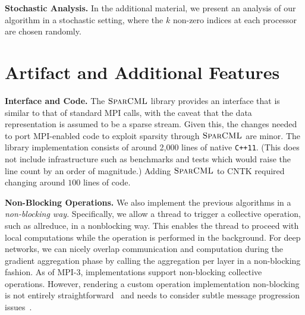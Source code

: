 \documentclass[11pt]{article}
\renewcommand{\paragraph}[1]{\vspace{0.1em} \noindent \textbf{#1}}
\newcommand{\mml}{$\textsc{SparCML}$}
\begin{document}
\paragraph{Stochastic Analysis.} In the additional material, we present an analysis of our algorithm in a stochastic setting, where the $k$ non-zero indices at each processor are chosen randomly.

\section{Artifact and Additional Features}
\label{sec:additional-features}

\paragraph{Interface and Code.} The \mml{} library provides an interface
that is similar to that of standard MPI calls, with the
caveat that the data representation is assumed to be a sparse stream.
Given this, the changes needed to port MPI-enabled code to exploit
sparsity through \mml{} are minor.  The library implementation consists
of around 2,000 lines of native \verb!C++11!. (This does not include
infrastructure such as benchmarks and tests which would raise the line
count by an order of magnitude.) Adding \mml{} to CNTK required changing
around $100$ lines of code. 

\paragraph{Non-Blocking Operations.}
We also implement the previous algorithms in a \emph{non-blocking way}.
Specifically, we allow a thread to trigger a collective operation, such
as allreduce, in a nonblocking way. This enables the thread to proceed
with local computations while the operation is performed in the
background. 
%
For deep networks, we can nicely overlap communication and computation
during the gradient aggregation phase by calling the aggregation per
layer in a non-blocking fashion.  As of MPI-3, implementations support
non-blocking collective operations.  However, rendering a custom
operation implementation non-blocking is not entirely
straightforward~\cite{libnbc, hoefler-sc07} and needs to consider subtle
message progression issues~\cite{hoefler-ib-threads}. 
%
%
%
\end{document}
